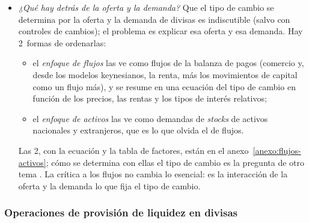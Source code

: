 \documentclass[11pt]{article}
\begin{document}
\begin{itemize}
\item \emph{¿Qué hay detrás de la oferta y la demanda?} Que el tipo de cambio se determina por la oferta y la demanda de divisas es indiscutible (salvo con controles de cambios); el problema es explicar esa oferta y esa demanda. Hay 2~formas de ordenarlas:
  \begin{itemize}
  \item el \emph{enfoque de flujos} las ve como flujos de la balanza de pagos (comercio y, desde los modelos keynesianos, la renta, más los movimientos de capital como un flujo más), y se resume en una ecuación del tipo de cambio en función de los precios, las rentas y los tipos de interés relativos\nocite{Kallianiotis2013Exchange};
  \item el \emph{enfoque de activos} las ve como demandas de \emph{stocks} de activos nacionales y extranjeros, que es lo que olvida el de flujos.
  \end{itemize}
  Las 2, con la ecuación y la tabla de factores, están en el anexo~\ref{anexo:flujos-activos}; cómo se determina con ellas el tipo de cambio es la pregunta de otro tema . La crítica a los flujos no cambia lo esencial: es la interacción de la oferta y la demanda lo que fija el tipo de cambio.
\end{itemize}

\subsubsection{Operaciones de provisión de liquidez en divisas}\label{sec:op-liquidez}
\end{document}
